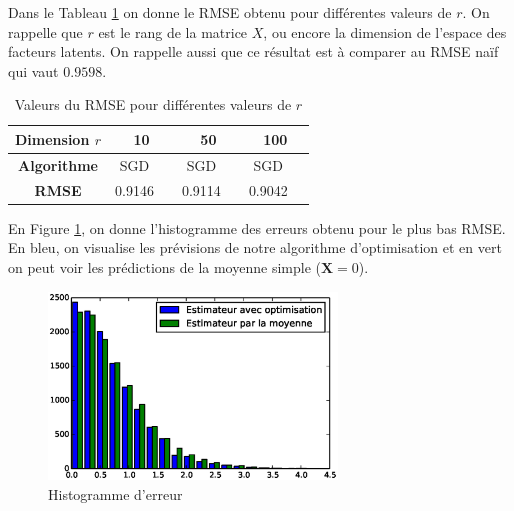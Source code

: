 \documentclass[10pt,a4paper]{article}
\begin{document}
Dans le Tableau \ref{RMSE_vs_r} on donne le RMSE obtenu pour différentes valeurs de $r$. On rappelle que $r$ est le rang de la matrice $X$, ou encore la dimension de l'espace des facteurs latents. On rappelle aussi que ce résultat est à comparer au RMSE naïf qui vaut $0.9598$.

\begin{table}[h]
\begin{center}
   \begin{tabular}{|c|c|c|c|c|c|c|}
  	\hline
  	\textbf{Dimension $r$} & \multicolumn{2}{c|}{10} & \multicolumn{2}{c|}{50} & \multicolumn{2}{c|}{100} \\
  	\hline
  	\textbf{Algorithme} & SGD & \jel & SGD & \jel & SGD & \jel \\
  	\hline
  	\textbf{RMSE}  & 0.9146  &  & 0.9114 & & 0.9042 &\\
  	\hline
\end{tabular}
\end{center}
\caption{\label{RMSE_vs_r} Valeurs du RMSE pour différentes valeurs de $r$}
\end{table}

En Figure \ref{histo_best}, on donne l'histogramme des erreurs obtenu pour le plus bas RMSE. En bleu, on visualise les prévisions de notre algorithme d'optimisation et en vert on peut voir les prédictions de la moyenne simple ($\textbf{X}=0$). 




\begin{figure}[ht!]
\begin{center}
\includegraphics[height=5cm]{fig/hist.eps}
\caption{\label{histo_best} Histogramme d'erreur}
\end{center}
\end{figure}
\end{document}
